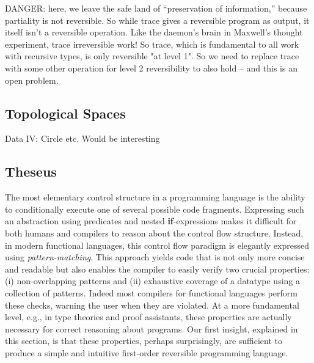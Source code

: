 \documentclass{article}
\begin{document}
DANGER: here, we leave the safe land of ``preservation of
information,'' because partiality is not reversible. So while trace
gives a reversible program as output, it itself isn't a reversible
operation. Like the daemon's brain in Maxwell's thought experiment,
trace irreversible work!  So trace, which is fundamental to all work
with recursive types, is only reversible "at level 1". So we need to
replace trace with some other operation for level 2 reversibility to
also hold -- and this is an open problem.

\subsection{Topological Spaces} 

Data IV: Circle etc. Would be interesting 

\subsection{Theseus}
 
The most elementary control structure in a programming language is the
ability to conditionally execute one of several possible code
fragments. Expressing such an abstraction using predicates and nested
\textbf{if}-expressions makes it difficult for both humans and
compilers to reason about the control flow structure. Instead, in
modern functional languages, this control flow paradigm is elegantly
expressed using \emph{pattern-matching}. This approach yields code
that is not only more concise and readable but also enables the
compiler to easily verify two crucial properties: (i) non-overlapping
patterns and (ii) exhaustive coverage of a datatype using a collection
of patterns. Indeed most compilers for functional languages perform
these checks, warning the user when they are violated. At a more
fundamental level, e.g., in type theories and proof assistants, these
properties are actually necessary for correct reasoning about
programs. Our first insight, explained in this section, is that these
properties, perhaps surprisingly, are sufficient to produce a simple
and intuitive first-order reversible programming language.
\end{document}

